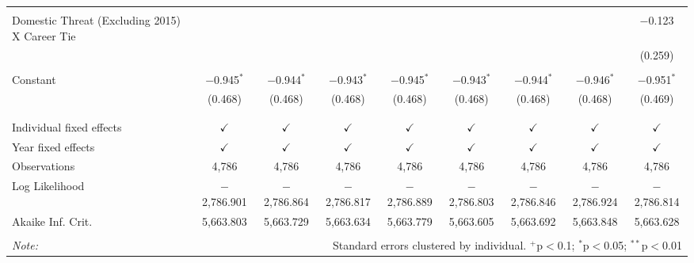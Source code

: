 \documentclass[12pt,letterpaper]{article}
\begin{document}
\begin{table}[!htbp]
\begin{tabular}{@{\extracolsep{5pt}}lcccccccc}
		& & & & & & & & \\ 
		Domestic Threat (Excluding 2015) X Career Tie &  &  &  &  &  &  &  & $-$0.123 \\ 
		&  &  &  &  &  &  &  & (0.259) \\ 
		& & & & & & & & \\ 
		Constant & $-$0.945$^{*}$ & $-$0.944$^{*}$ & $-$0.943$^{*}$ & $-$0.945$^{*}$ & $-$0.943$^{*}$ & $-$0.944$^{*}$ & $-$0.946$^{*}$ & $-$0.951$^{*}$ \\ 
		& (0.468) & (0.468) & (0.468) & (0.468) & (0.468) & (0.468) & (0.468) & (0.469) \\ 
		& & & & & & & & \\ 
		\hline \\[-1.8ex] 
		Individual fixed effects & $\checkmark$ & $\checkmark$ & $\checkmark$ & $\checkmark$ & $\checkmark$ & $\checkmark$ & $\checkmark$ & $\checkmark$ \\ 
		Year fixed effects & $\checkmark$ & $\checkmark$ & $\checkmark$ & $\checkmark$ & $\checkmark$ & $\checkmark$ & $\checkmark$ & $\checkmark$ \\ 
		Observations & 4,786 & 4,786 & 4,786 & 4,786 & 4,786 & 4,786 & 4,786 & 4,786 \\ 
		Log Likelihood & $-$2,786.901 & $-$2,786.864 & $-$2,786.817 & $-$2,786.889 & $-$2,786.803 & $-$2,786.846 & $-$2,786.924 & $-$2,786.814 \\ 
		Akaike Inf. Crit. & 5,663.803 & 5,663.729 & 5,663.634 & 5,663.779 & 5,663.605 & 5,663.692 & 5,663.848 & 5,663.628 \\ 
		\hline 
		\hline \\[-1.8ex] 
		\textit{Note:}  & \multicolumn{8}{r}{Standard errors clustered by individual. $^{+}$p$<$0.1; $^{*}$p$<$0.05; $^{**}$p$<$0.01}} \\ 
\end{tabular} 
\end{table} 
\end{document}
